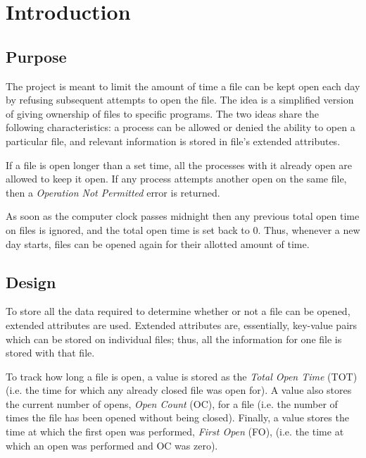 \section{Introduction}

\subsection{Purpose}

The project is meant to limit the amount of time a file can be kept open each day by refusing subsequent attempts to open the file. The idea is a simplified version of giving ownership of files to specific programs. The two ideas share the following characteristics: a process can be allowed or denied the ability to open a particular file, and relevant information is stored in file's extended attributes.

If a file is open longer than a set time, all the processes with it already open are allowed to keep it open. If any process attempts another open on the same file, then a \textit{Operation Not Permitted} error is returned.

As soon as the computer clock passes midnight then any previous total open time on files is ignored, and the total open time is set back to 0. Thus, whenever a new day starts, files can be opened again for their allotted amount of time.

\subsection{Design}

To store all the data required to determine whether or not a file can be opened, extended attributes are used. Extended attributes are, essentially, key-value pairs which can be stored on individual files; thus, all the information for one file is stored with that file.

To track how long a file is open, a value is stored as the \textit{Total Open Time} (TOT) (i.e. the time for which any already closed file was open for). A value also stores the current number of opens, \textit{Open Count} (OC), for a file (i.e. the number of times the file has been opened without being closed). Finally, a value stores the time at which the first open was performed, \textit{First Open} (FO), (i.e. the time at which an open was performed and OC was zero).

